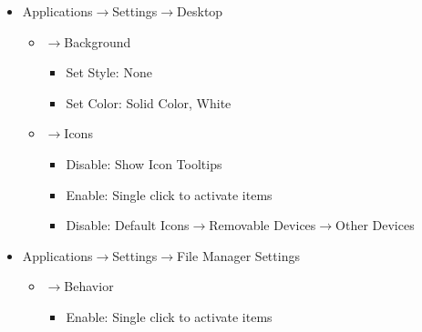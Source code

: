 \documentclass{memoir}
\begin{document}
\vspace{0.5cm}
\begin{itemize}
\item[]{Applications$\rightarrow$Settings$\rightarrow$Desktop}
  \begin{itemize}
  \item[]{$\rightarrow$Background}
    \begin{itemize}
      \item[]{Set Style: None}
      \item[]{Set Color: Solid Color, White}
    \end{itemize}
  \item[]{$\rightarrow$Icons}
    \begin{itemize}
      \item[]{Disable: Show Icon Tooltips}
      \item[]{Enable: Single click to activate items}
      \item[]{Disable: Default Icons$\rightarrow$Removable Devices$\rightarrow$Other Devices}
    \end{itemize}
  \end{itemize}
\end{itemize}

\vspace{0.5cm}
\begin{itemize}
\item[]{Applications$\rightarrow$Settings$\rightarrow$File Manager Settings}
  \begin{itemize}
  \item[]{$\rightarrow$Behavior}
    \begin{itemize}
      \item[]{Enable: Single click to activate items}
    \end{itemize}
  \end{itemize}
\end{itemize}
\end{document}
